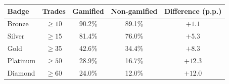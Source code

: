 \begin{tabular}{@{}lcccc@{}}
\toprule
Badge & Trades & Gamified & Non-gamified & Difference (p.p.) \\
\midrule
Bronze   & $\ge 10$ & 90.2\% & 89.1\% & $+1.1$ \\
Silver   & $\ge 15$ & 81.4\% & 76.0\% & $+5.3$ \\
Gold     & $\ge 35$ & 42.6\% & 34.4\% & $+8.3$ \\
Platinum & $\ge 50$ & 28.9\% & 16.7\% & $+12.3$ \\
Diamond  & $\ge 60$ & 24.0\% & 12.0\% & $+12.0$ \\
\bottomrule
\end{tabular}
